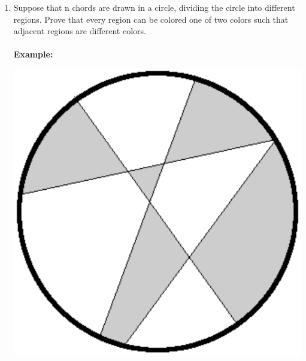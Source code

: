 \documentclass[12pt,letterpaper]{article}
\theoremstyle{plain}
\theoremstyle{definition}
\begin{document}
\begin{enumerate}[1.]
\newpage

\item Suppose that n chords are drawn in a circle, dividing the circle into different regions.
Prove that every region can be colored one of two colors such that adjacent regions are
different colors. \\
\ \\
{\bf Example: }
\begin{center}
\includegraphics[scale=0.25]{circle}
\end{center}
 

\end{enumerate}
\end{document}
